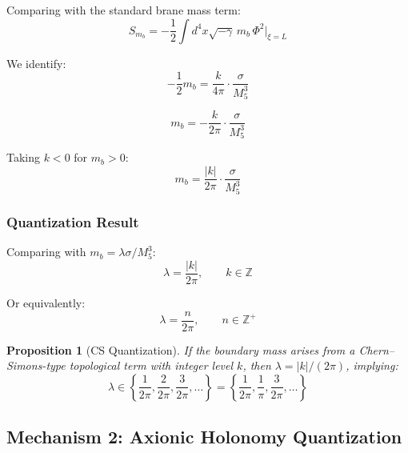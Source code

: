 \documentclass[11pt,a4paper]{article}
\newcommand{\Mfive}{M_5}
\newcommand{\mb}{m_b}
\theoremstyle{definition}
\theoremstyle{plain}
\newtheorem{proposition}{Proposition}[section]
\theoremstyle{remark}
\begin{document}
Comparing with the standard brane mass term:
\begin{equation}
S_{\mb} = -\frac{1}{2} \int d^4x \sqrt{-\gamma} \, \mb \, \Phi^2 \big|_{\xi=L}
\label{eq:Smb}
\end{equation}

We identify:
\begin{equation}
-\frac{1}{2}\mb = \frac{k}{4\pi} \cdot \frac{\sigma}{\Mfive^3}
\label{eq:identification}
\end{equation}

\begin{equation}
\boxed{\mb = -\frac{k}{2\pi} \cdot \frac{\sigma}{\Mfive^3}}
\label{eq:mb-CS}
\end{equation}

Taking $k < 0$ for $\mb > 0$:
\begin{equation}
\mb = \frac{|k|}{2\pi} \cdot \frac{\sigma}{\Mfive^3}
\label{eq:mb-CS-pos}
\end{equation}

\subsubsection{Quantization Result}

Comparing with $\mb = \lambda\sigma/\Mfive^3$:
\begin{equation}
\boxed{\lambda = \frac{|k|}{2\pi}, \qquad k \in \mathbb{Z}}
\label{eq:lambda-CS}
\end{equation}

Or equivalently:
\begin{equation}
\lambda = \frac{n}{2\pi}, \qquad n \in \mathbb{Z}^+
\label{eq:lambda-CS-n}
\end{equation}

\begin{proposition}[CS Quantization]
\label{prop:CS-quant}
If the boundary mass arises from a Chern--Simons-type topological term with
integer level $k$, then $\lambda = |k|/(2\pi)$, implying:
\begin{equation}
\lambda \in \left\{ \frac{1}{2\pi}, \frac{2}{2\pi}, \frac{3}{2\pi}, \ldots \right\}
= \left\{ \frac{1}{2\pi}, \frac{1}{\pi}, \frac{3}{2\pi}, \ldots \right\}
\label{eq:lambda-set-CS}
\end{equation}
\end{proposition}

\subsection{Mechanism 2: Axionic Holonomy Quantization}
\end{document}
